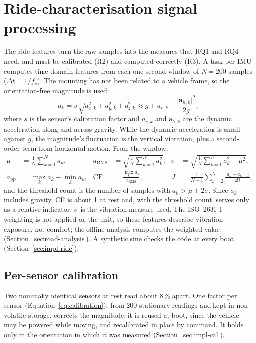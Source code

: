 \section{Ride-characterisation signal processing}
\label{sec:ride-characterisation}

The ride features turn the raw samples into the measures that RQ1 and RQ4 need, and must be calibrated (R2) and computed correctly (R3). A task per IMU computes time-domain features from each one-second window of $N = 200$ samples ($\Delta t = 1/f_s$). The mounting has not been related to a vehicle frame, so the orientation-free magnitude is used:
\begin{equation}
a_k = s\,\sqrt{a_{x,k}^2 + a_{y,k}^2 + a_{z,k}^2} \approx g + a_{v,k} + \frac{\lvert \mathbf{a}_{h,k} \rvert^2}{2g},
\label{eq:magnitude}
\end{equation}
where $s$ is the sensor's calibration factor and $a_{v,k}$ and $\mathbf{a}_{h,k}$ are the dynamic acceleration along and across gravity. While the dynamic acceleration is small against $g$, the magnitude's fluctuation is the vertical vibration, plus a second-order term from horizontal motion. From the window,
\begin{align}
\mu &= \frac{1}{N}\sum_{k=1}^{N} a_k, &
a_{\mathrm{RMS}} &= \sqrt{\frac{1}{N}\sum_{k=1}^{N} a_k^2}, &
\sigma &= \sqrt{\frac{1}{N}\sum_{k=1}^{N} a_k^2 - \mu^2}, \label{eq:mean-rms-std}\\
a_{\mathrm{pp}} &= \max_k a_k - \min_k a_k, &
\mathrm{CF} &= \frac{\max_k a_k}{a_{\mathrm{RMS}}}, &
\bar{J} &= \frac{1}{N-1}\sum_{k=2}^{N} \frac{\lvert a_k - a_{k-1}\rvert}{\Delta t}, \label{eq:pp-cf-jerk}
\end{align}
and the threshold count is the number of samples with $a_k > \mu + 2\sigma$. Since $a_k$ includes gravity, CF is about 1 at rest and, with the threshold count, serves only as a relative indicator; $\sigma$ is the vibration measure used. The ISO~2631-1 weighting is not applied on the unit, so these features describe vibration exposure, not comfort; the offline analysis computes the weighted value (Section~\ref{sec:road-analysis}). A synthetic sine checks the code at every boot (Section~\ref{sec:impl-ride}).

\subsection{Per-sensor calibration}
\label{sec:imu-magnitude-calibration}

Two nominally identical sensors at rest read about 8\,\% apart. One factor per sensor (Equation~\ref{eq:calibration}), from 200 stationary readings and kept in non-volatile storage, corrects the magnitude; it is reused at boot, since the vehicle may be powered while moving, and recalibrated in place by command. It holds only in the orientation in which it was measured (Section~\ref{sec:impl-cal}).

